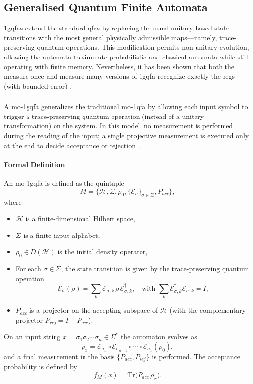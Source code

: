 \subsection{Generalised Quantum Finite Automata}
\label{sec:generalised-qfa}
\glspl{1gqfa} extend the standard \glspl{qfa} by replacing the usual unitary-based state transitions with the most general physically admissible maps—namely, trace-preserving quantum operations. This modification permits non-unitary evolution, allowing the automata to simulate probabilistic and classical automata while still operating with finite memory. Nevertheless, it has been shown that both the measure-once and measure-many versions of \gls{1gqfa} recognize exactly the \glspl{reg} (with bounded error) \cite{li2012characterizations}.

\subsubsection{}
A \gls{mo-1gqfa} generalizes the traditional \gls{mo-1qfa} by allowing each input symbol to trigger a trace-preserving quantum operation (instead of a unitary transformation) on the system. In this model, no measurement is performed during the reading of the input; a single projective measurement is executed only at the end to decide acceptance or rejection \cite{li2012characterizations}.

\paragraph{Formal Definition}
An \gls{mo-1gqfa} is defined as the quintuple
\[
M = \{ \mathcal{H},\Sigma,\rho_0,\{\mathcal{E}_\sigma\}_{\sigma\in\Sigma},P_{acc}\},
\]
where
\begin{itemize}
  \item $\mathcal{H}$ is a finite-dimensional Hilbert space,
  \item $\Sigma$ is a finite input alphabet,
  \item $\rho_0\in D(\mathcal{H})$ is the initial density operator,
  \item For each $\sigma\in\Sigma$, the state transition is given by the trace-preserving quantum operation 
  \[
  \mathcal{E}_\sigma(\rho)=\sum_{k} \mathcal{E}_{\sigma,k}\,\rho\,\mathcal{E}_{\sigma,k}^\dagger,\quad \text{with } \sum_{k} \mathcal{E}_{\sigma,k}^\dagger \mathcal{E}_{\sigma,k}=I,
  \]
  \item $P_{acc}$ is a projector on the accepting subspace of $\mathcal{H}$ (with the complementary projector $P_{rej}=I-P_{acc}$).
\end{itemize}
On an input string $x=\sigma_1\sigma_2\cdots\sigma_n\in\Sigma^*$ the automaton evolves as
\[
\rho_x = \mathcal{E}_{\sigma_n}\circ \mathcal{E}_{\sigma_{n-1}}\circ\cdots\circ \mathcal{E}_{\sigma_1}(\rho_0),
\]
and a final measurement in the basis $\{P_{acc},P_{rej}\}$ is performed. The acceptance probability is defined by
\[
f_M(x)=\mathrm{Tr}\bigl(P_{acc}\,\rho_x\bigr).
\]

